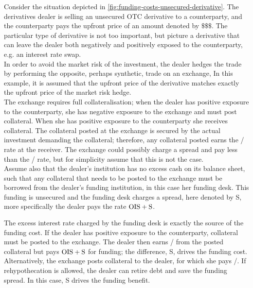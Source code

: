 \documentclass[main.tex]{subfiles}
\begin{document}
        \begin{example}
        Consider the situation depicted in \cref{fig:funding-costs-unsecured-derivative}.
        The derivatives dealer is selling an unsecured OTC derivative to a counterparty,
        and the counterparty pays the upfront price of an amount denoted by $\$\$\$$.
        The particular type of derivative is not too important, 
        but picture a derivative that can leave the dealer both negatively and positively exposed to the counterparty, 
        e.g. an interest rate swap.
        \\
        In order to avoid the market risk of the investment, 
        the dealer hedges the trade by performing the opposite, 
        perhaps synthetic, trade on an exchange,
        In this example, it is assumed that the upfront price of the derivative 
        matches exactly the upfront price of the market risk hedge.
        \\
        The exchange requires full collateralisation;
        when the dealer has positive exposure to the counterparty, 
        she has negative exposure to the exchange and must post collateral. 
        When she has positive exposure to the counterparty she receives collateral.
        The collateral posted at the exchange is secured by the actual investment demanding the collateral;
        therefore, any collateral posted earns the \OIS/ rate at the receiver.
        The exchange could possibly charge a spread and pay less than the \OIS/ rate,
        but for simplicity assume that this is not the case.
        \\
        Assume also that the dealer's institution has no excess cash on its balance sheet, 
        such that any collateral that needs to be posted to the exchange 
        must be borrowed from the dealer's funding institution,
        in this case her funding desk. 
        This funding is unsecured and the funding desk charges a spread, here denoted by S,
        more specifically the dealer pays the rate $\OIS/ + \text{S}$.

        The excess interest rate charged by the funding desk is exactly the source of the funding cost.
        If the dealer has positive exposure to the counterparty, collateral must be posted to the exchange.
        The dealer then earns \OIS/ from the posted collateral but pays $\OIS/ + \text{S}$ for funding;
        the difference, S, drives the funding cost.
        Alternatively, the exchange posts collateral to the dealer, for which she pays \OIS/.
        If rehypothecation is allowed, the dealer can retire debt and save the funding spread.
        In this case, S drives the funding benefit.
        \end{example}
\end{document}
